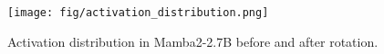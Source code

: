 


  
  

  

\begin{figure}[!tb]
    \centering
    \texttt{[image: fig/activation\_distribution.png]}
    \caption{Activation distribution in Mamba2-2.7B before and after rotation.}
    \vspace{-10pt}
    \label{fig:activation_distribution}
\end{figure}


